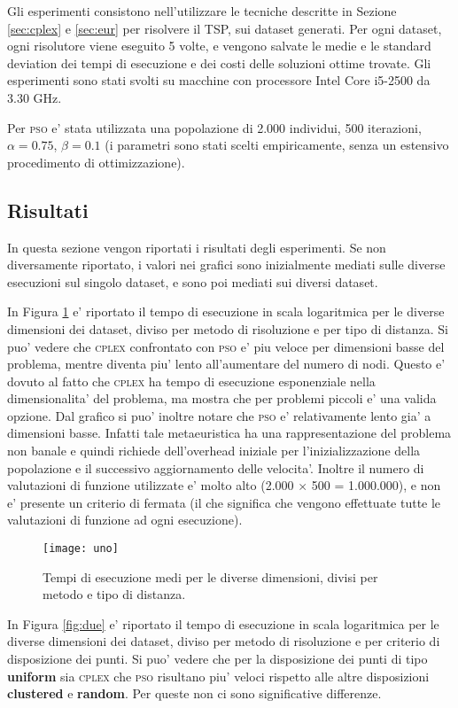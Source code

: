 \documentclass[
12pt, %
a4paper, %
oneside, %
headinclude,footinclude, %
BCOR5mm, %
]{scrartcl}
\begin{document}
Gli esperimenti consistono nell'utilizzare le tecniche descritte in Sezione \ref{sec:cplex} e \ref{sec:eur} per risolvere il TSP, sui dataset generati. Per ogni dataset, ogni risolutore viene eseguito 5 volte, e vengono salvate le medie e le standard deviation dei tempi di esecuzione e dei costi delle soluzioni ottime trovate. Gli esperimenti sono stati svolti su macchine con processore Intel Core i5-2500 da 3.30 GHz. 

Per \textsc{pso} e' stata utilizzata una popolazione di 2.000 individui, 500 iterazioni, $\alpha = 0.75$, $\beta=0.1$ (i parametri sono stati scelti empiricamente, senza un estensivo procedimento di ottimizzazione).

\subsection{Risultati}
In questa sezione vengon riportati i risultati degli esperimenti. Se non diversamente riportato, i valori nei grafici sono inizialmente mediati sulle diverse esecuzioni sul singolo dataset, e sono poi mediati sui diversi dataset.

In Figura \ref{fig:uno} e' riportato il tempo di esecuzione in scala logaritmica per le diverse dimensioni dei dataset, diviso per metodo di risoluzione e per tipo di distanza. Si puo' vedere che \textsc{cplex} confrontato con \textsc{pso} e' piu veloce per dimensioni basse del problema, mentre diventa piu' lento all'aumentare del numero di nodi. Questo e' dovuto al fatto che \textsc{cplex} ha tempo di esecuzione esponenziale nella dimensionalita' del problema, ma mostra che per problemi piccoli e' una valida opzione. Dal grafico si puo' inoltre notare che \textsc{pso} e' relativamente lento gia' a dimensioni basse. Infatti tale metaeuristica ha una rappresentazione del problema non banale e quindi richiede dell'overhead iniziale per l'inizializzazione della popolazione e il successivo aggiornamento delle velocita'. Inoltre il numero di valutazioni di funzione utilizzate e' molto alto (2.000 $\times$ 500 = 1.000.000), e non e' presente un criterio di fermata (il che significa che vengono effettuate tutte le valutazioni di funzione ad ogni esecuzione).
\begin{figure}[htpb]
	\centering
	\texttt{[image: uno]}
	\caption[]{Tempi di esecuzione medi per le diverse dimensioni, divisi per metodo e tipo di distanza.}
	\label{fig:uno}
\end{figure}

In Figura \ref{fig:due} e' riportato il tempo di esecuzione in scala logaritmica per le diverse dimensioni dei dataset, diviso per metodo di risoluzione e per criterio di disposizione dei punti. Si puo' vedere che per la disposizione dei punti di tipo \textbf{uniform} sia \textsc{cplex} che \textsc{pso} risultano piu' veloci rispetto alle altre disposizioni \textbf{clustered} e \textbf{random}. Per queste non ci sono significative differenze.
\end{document}
